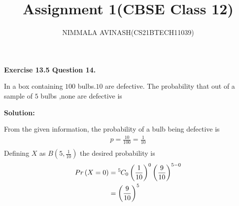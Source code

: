 \documentclass[journal,twocolumn]{IEEEtran}
\title{Assignment 1(CBSE Class 12)}
\author{NIMMALA AVINASH(CS21BTECH11039)}
\providecommand{\brak}[1]{\ensuremath{\left(#1\right)}}
\newcommand*{\permcomb}[4][0mu]{{{}^{#3}\mkern#1#2_{#4}}}
\newcommand*{\comb}[1][-1mu]{\permcomb[#1]{C}}
\begin{document}
\maketitle

{\Large \textbf{Exercise 13.5 Question 14.}}

\begin{Large}

In a box containing $100$ bulbs.$10$ are defective. The probability that out of a sample of $5$ bulbs ,none are defective is \\

\end{Large}

{\Large \textbf{Solution:}\\}
\begin{Large}
From the given information, the probability of a bulb being defective is
\begin{align}
p = \frac{10}{100} = \frac{1}{10}\\
\end{align}
Defining $X$ as $B \brak{5,\frac{1}{10}}$  the desired probability is\\
\begin{align}
    Pr\brak{X=0} &= \comb{5}{0} \brak{\frac{1}{10}}^{0} \brak{\frac{9}{10}} ^ {5-0}\\
    &= \brak{\frac{9}{10}}^5
\end{align}
\end{Large}
\end{document}
